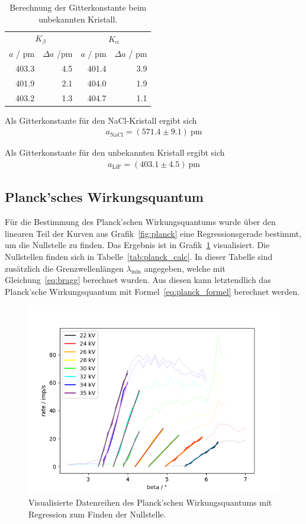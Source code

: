 \documentclass{article}
\begin{document}
\begin{table}[H]
\centering
\caption{Berechnung der Gitterkonstante beim unbekannten Kristall.}
\label{tab:gitterkonst_unkonwn}
\begin{tabular}{rr|rr}
\multicolumn{2}{c|}{$K_\beta$} & \multicolumn{2}{c}{$K_\alpha$} \\ 
$a$ / pm & $\Delta a$ /pm & $a$ / pm & $\Delta a$ / pm\\
\hline
403.3 & 4.5 & 401.4 & 3.9 \\
401.9 & 2.1 & 404.0 & 1.9 \\
403.2 & 1.3 & 404.7 & 1.1
\end{tabular}
\end{table}

Als Gitterkonstante für den NaCl-Kristall ergibt sich
\begin{align*}
a_\text{NaCl} = (571.4\pm 9.1)~\text{pm}
\end{align*}

Als Gitterkonstante für den unbekannten Kristall ergibt sich
\begin{align*}
a_\text{LiF} = (403.1\pm 4.5)~\text{pm}
\end{align*}


\subsection{Planck'sches Wirkungsquantum}

Für die Bestimmung des Planck'schen Wirkungsquantums wurde über den linearen Teil der Kurven aus Grafik~\ref{fig:planck} eine Regressionsgerade bestimmt, um die Nullstelle zu finden. Das Ergebnis ist in Grafik~\ref{fig:planck_regression} visualisiert. Die Nullstellen finden sich in Tabelle~\ref{tab:planck_calc}. In dieser Tabelle sind zusätzlich die Grenzwellenlängen $\lambda_{\min}$ angegeben, welche mit Gleichung~\eqref{eq:bragg} berechnet wurden. Aus diesen kann letztendlich das Planck'sche Wirkungsquantum mit Formel~\eqref{eq:planck_formel} berechnet werden.


\begin{figure}[H]
\includegraphics[scale=0.9]{planck_regression.png}
\caption{Visualisierte Datenreihen des Planck'schen Wirkungsquantums mit Regression zum Finden der Nullstelle.}
\label{fig:planck_regression}
\end{figure}
\end{document}
